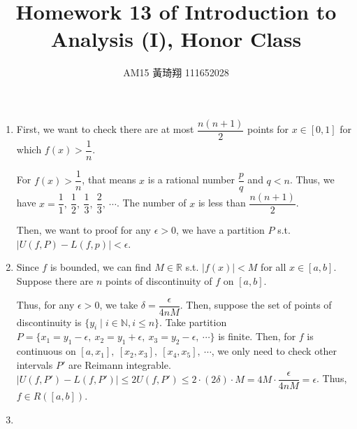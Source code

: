 \documentclass[12pt]{article}
\title{Homework 13 of Introduction to Analysis (I), Honor Class}
\author{AM15 黃琦翔 111652028}
\begin{document}
\maketitle
\begin{enumerate}
    \item First, we want to check there are at most $\dfrac{n(n+1)}{2}$ points for $x\in [0, 1]$ for which $f(x) > \dfrac{1}{n}$.
    
    For $f(x) > \dfrac{1}{n}$, that means $x$ is a rational number $\dfrac{p}{q}$ and $q < n$.
    Thus, we have $x = \dfrac{1}{1},\ \dfrac{1}{2},\ \dfrac{1}{3},\ \dfrac{2}{3},\ \cdots$.
    The number of $x$ is less than $\dfrac{n(n+1)}{2}$.

    Then, we want to proof for any $\epsilon > 0$, we have a partition $P$ s.t. $|U(f, P) - L(f, p)| < \epsilon$.


    \item Since $f$ is bounded, we can find $M\in \mathbb{R}$ s.t. $|f(x)| < M$ for all $x\in [a, b]$.
    Suppose there are $n$ points of discontinuity of $f$ on $[a, b]$.
    
    Thus, for any $\epsilon > 0$, we take $\delta = \dfrac{\epsilon}{4nM}$.
    Then, suppose the set of points of discontinuity is $\lbrace y_i\mid i \in \mathbb{N}, i \leq n\rbrace$.
    Take partition $P = \lbrace x_1 = y_1 - \epsilon,\ x_2 = y_1 + \epsilon,\ x_3 = y_2-\epsilon,\ \cdots\rbrace$ is finite.
    Then, for $f$ is continuous on $[a, x_1],\ [x_2, x_3],\ [x_4, x_5],\ \cdots$, 
    we only need to check other intervals $P'$ are Reimann integrable.
    $|U(f, P') - L(f, P')| \leq 2U(f, P') \leq 2\cdot (2\delta) \cdot M = 4M \cdot \dfrac{\epsilon}{4nM} = \epsilon$.
    Thus, $f\in R([a, b])$.

    \item 
\end{enumerate}
\end{document}
